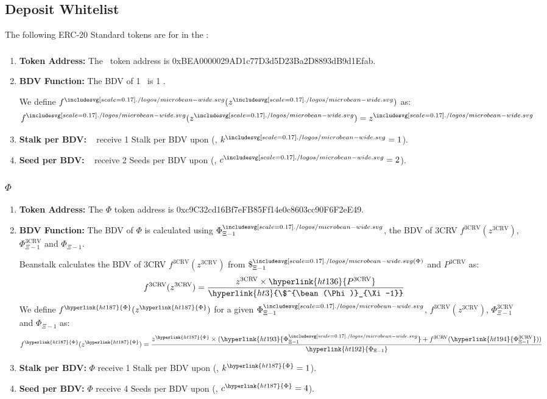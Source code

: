 \documentclass[class=article, crop=false]{standalone}
\begin{document}
\subsection{Deposit Whitelist}
The following ERC-20 Standard tokens are  for  in the :
\subsubsection{\Bean}
    \begin{enumerate}
        \item \textbf{Token Address:} The \Bean\ token address is 0xBEA0000029AD1c77D3d5D23Ba2D8893dB9d1Efab.
        \item \textbf{BDV Function:} The BDV of 1 \Bean\ is 1 \Bean. 

We define $f^{\bean}(z^{\bean})$ as:
$$f^{\bean}(z^{\bean}) = z^{\bean}$$
        \item \textbf{Stalk per BDV:} \Bean\  receive 1 Stalk per BDV upon  (, $k^{\bean} = 1$).
        \item \textbf{Seed per BDV:} \Bean\  receive 2 Seeds per BDV upon  (, $c^{\bean} = 2$).
    \end{enumerate}
\subsubsection{$\Phi$}
    \begin{enumerate}
        \item \textbf{Token Address:} The \hyperlink{ht187}{$\Phi$} token address is 0xc9C32cd16Bf7eFB85Ff14e0c8603cc90F6F2eE49.
        \item \textbf{BDV Function:} The BDV of \hyperlink{ht187}{$\Phi$} is calculated using \hyperlink{ht193}{$\Phi_{\Xi-1}^{\bean}$}, the BDV of 3CRV $f^{\text{3CRV}}(z^{\text{3CRV}})$, \hyperlink{ht194}{$\Phi_{\Xi-1}^{\text{3CRV}}$} and \hyperlink{ht192}{$\Phi_{\Xi-1}$}.

Beanstalk calculates the BDV of 3CRV $f^{\text{3CRV}}(z^{\text{3CRV}})$ from \hyperlink{ht3}{$\$^{\bean(\Phi)}_{\Xi-1}$} and \hyperlink{ht136}{$P^{\text{3CRV}}$} as:
$$f^{\text{3CRV}}(z^{\text{3CRV}}) = \frac{z^{\text{3CRV}} \times \hyperlink{ht136}{P^{\text{3CRV}}}}{\hyperlink{ht3}{\$^{\bean(\Phi)}_{\Xi-1}}}$$
We define $f^{\hyperlink{ht187}{\Phi}}(z^{\hyperlink{ht187}{\Phi}})$ for a given \hyperlink{ht193}{$\Phi_{\Xi-1}^{\bean}$}, $f^{\text{3CRV}}(z^{\text{3CRV}})$, \hyperlink{ht194}{$\Phi_{\Xi-1}^{\text{3CRV}}$} and \hyperlink{ht192}{$\Phi_{\Xi-1}$} as:
$$f^{\hyperlink{ht187}{\Phi}}(z^{\hyperlink{ht187}{\Phi}}) = \frac{z^{\hyperlink{ht187}{\Phi}} \times ( \hyperlink{ht193}{\Phi_{\Xi-1}^{\bean}} + f^{\text{3CRV}}(\hyperlink{ht194}{\Phi_{\Xi-1}^{\text{3CRV}}}))}{\hyperlink{ht192}{\Phi_{\Xi-1}}}$$
        \item \textbf{Stalk per BDV:} \hyperlink{ht187}{$\Phi$}  receive 1 Stalk per BDV upon  (, $k^{\hyperlink{ht187}{\Phi}} = 1$).
        \item \textbf{Seed per BDV:} \hyperlink{ht187}{$\Phi$}  receive 4 Seeds per BDV upon  (, $c^{\hyperlink{ht187}{\Phi}} = 4$).
    \end{enumerate}
\end{document}
